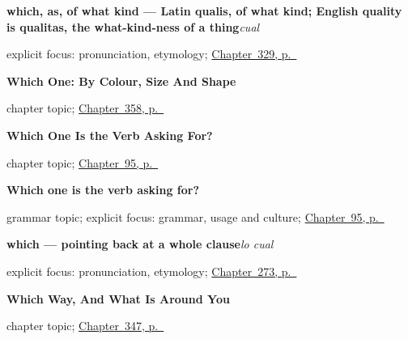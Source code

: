 \noindent\begin{minipage}[t]{\linewidth}
\raggedright
\textbf{which, as, of what kind — Latin qualis, of what kind; English quality is qualitas, the what-kind-ness of a thing}\enspace\emph{cual}\par
\footnotesize explicit focus: pronunciation, etymology; \hyperref[ch:tal-y-salvo]{Chapter~329, p.~\pageref*{ch:tal-y-salvo}}
\end{minipage}\par\smallskip

\noindent\begin{minipage}[t]{\linewidth}
\raggedright
\textbf{Which One: By Colour, Size And Shape}\par
\footnotesize chapter topic; \hyperref[ch:el-color-y-el-tamano]{Chapter~358, p.~\pageref*{ch:el-color-y-el-tamano}}
\end{minipage}\par\smallskip

\noindent\begin{minipage}[t]{\linewidth}
\raggedright
\textbf{Which One Is the Verb Asking For?}\par
\footnotesize chapter topic; \hyperref[ch:which-object]{Chapter~95, p.~\pageref*{ch:which-object}}
\end{minipage}\par\smallskip

\noindent\begin{minipage}[t]{\linewidth}
\raggedright
\textbf{Which one is the verb asking for?}\par
\footnotesize grammar topic; explicit focus: grammar, usage and culture; \hyperref[ch:which-object]{Chapter~95, p.~\pageref*{ch:which-object}}
\end{minipage}\par\smallskip

\noindent\begin{minipage}[t]{\linewidth}
\raggedright
\textbf{which — pointing back at a whole clause}\enspace\emph{lo cual}\par
\footnotesize explicit focus: pronunciation, etymology; \hyperref[ch:parrafo]{Chapter~273, p.~\pageref*{ch:parrafo}}
\end{minipage}\par\smallskip

\noindent\begin{minipage}[t]{\linewidth}
\raggedright
\textbf{Which Way, And What Is Around You}\par
\footnotesize chapter topic; \hyperref[ch:el-norte-y-el-sur]{Chapter~347, p.~\pageref*{ch:el-norte-y-el-sur}}
\end{minipage}\par\smallskip

